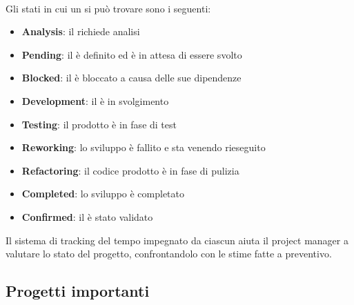    \\
   Gli stati in cui un  si può trovare sono i seguenti:
   \begin{itemize}
      \item{\textbf{Analysis}: il  richiede analisi}
      \item{\textbf{Pending}: il  è definito ed è in attesa di essere svolto}
      \item{\textbf{Blocked}: il  è bloccato a causa delle sue dipendenze}
      \item{\textbf{Development}: il  è in svolgimento}
      \item{\textbf{Testing}: il prodotto è in fase di test}
      \item{\textbf{Reworking}: lo sviluppo è fallito e sta venendo rieseguito}
      \item{\textbf{Refactoring}: il codice prodotto è in fase di pulizia}
      \item{\textbf{Completed}: lo sviluppo è completato}
      \item{\textbf{Confirmed}: il  è stato validato}
   \end{itemize}
   Il sistema di tracking del tempo impegnato da ciascun  aiuta il project manager a valutare lo stato del progetto, confrontandolo con le stime fatte a preventivo.

   \subsection{Progetti importanti}
